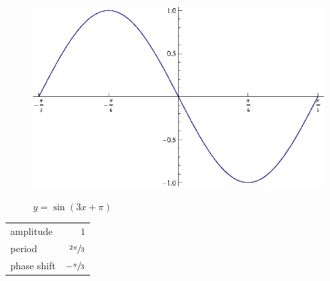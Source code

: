 \documentclass{exam}
\begin{document}
\begin{description}
        \begin{figure}[H]
          \centering
          \includegraphics[scale=1.0]{exercise39.eps}

          $y = \sin \left( 3x + \pi \right)$
        \end{figure}

        \begin{tabular}[H]{lr}
          \toprule
          amplitude   & $1$ \\
          period      & $\sfrac{2 \pi}{3}$ \\
          phase shift & $- \sfrac{\pi}{3}$ \\
          \bottomrule
        \end{tabular}

      \pagebreak





\end{description}
\end{document}
